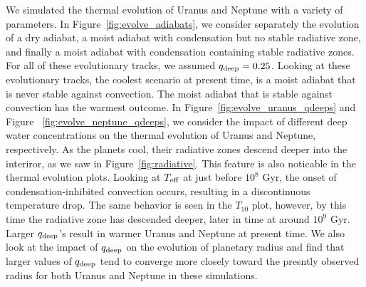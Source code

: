 \documentclass[11pt]{ucscthesisbs}
\begin{document}
We simulated the thermal evolution of Uranus and Neptune with a variety of parameters. In Figure~\ref{fig:evolve_adiabats}, we consider separately the evolution of a dry adiabat, a moist adiabat with condensation but no stable radiative zone, and finally a moist adiabat with condensation containing stable radiative zones. For all of these evolutionary tracks, we assumed $q_{\rm deep} = 0.25$. Looking at these evolutionary tracks, the coolest scenario at present time, is a moist adiabat that is never stable against convection. The moist adiabat that is stable against convection has the warmest outcome. In Figure~\ref{fig:evolve_uranus_qdeeps} and Figure ~\ref{fig:evolve_neptune_qdeeps}, we consider the impact of different deep water concentrations on the thermal evolution of Uranus and Neptune, respectively. As the planets cool, their radiative zones descend deeper into the interiror, as we saw in Figure~\ref{fig:radiative}. This feature is also noticable in the thermal evolution plots. Looking at $T_{\rm eff}$ at just before $10^8$ Gyr, the onset of condensation-inhibited convection occurs, resulting in a discontinuous temperature drop. The same behavior is seen in the $T_{10}$ plot, however, by this time the radiative zone has descended deeper, later in time at around $10^9$ Gyr. Larger $q_{\rm deep}$'s result in warmer Uranus and Neptune at present time. We also look at the impact of $q_{\rm deep}$ on the evolution of planetary radius and find that larger values of $q_{\rm deep}$ tend to converge more closely toward the presntly observed radius for both Uranus and Neptune in these simulations. 
\end{document}

